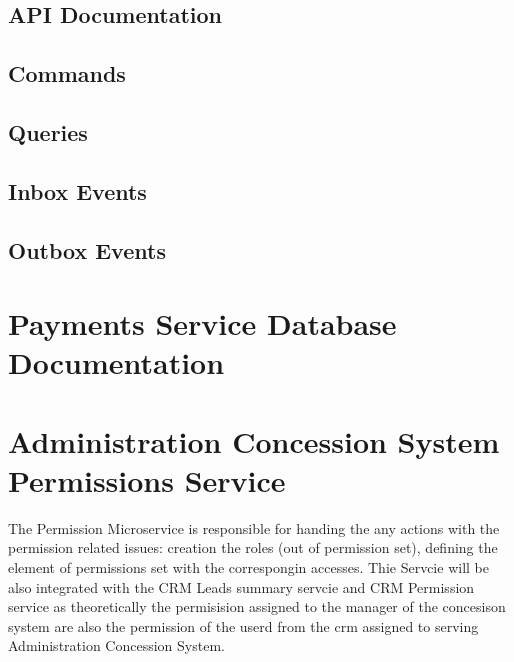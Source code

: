 \documentclass[letterpaper,10pt,english]{sphinxmanual}
\begin{document}


\subsection{API Documentation}
\label{\detokenize{administration_concession_system/payments_service:api-documentation}}

\subsection{Commands}
\label{\detokenize{administration_concession_system/payments_service:commands}}

\subsection{Queries}
\label{\detokenize{administration_concession_system/payments_service:queries}}

\subsection{Inbox Events}
\label{\detokenize{administration_concession_system/payments_service:inbox-events}}

\subsection{Outbox Events}
\label{\detokenize{administration_concession_system/payments_service:outbox-events}}

\section{Payments Service Database Documentation}
\label{\detokenize{administration_concession_system/payments_service:payments-service-database-documentation}}
\sphinxstepscope


\section{Administration Concession System Permissions Service}
\label{\detokenize{administration_concession_system/permissions_service:administration-concession-system-permissions-service}}\label{\detokenize{administration_concession_system/permissions_service::doc}}
\sphinxAtStartPar
The Permission Microservice is responsible for handing the any actions with the permission related issues: creation the roles (out of permission set), defining the element of permissions set with the correspongin accesses. Thie Servcie will be also integrated with the CRM Leads summary servcie and CRM Permission service as theoretically the permisision assigned to the manager of the concesison system are also the permission of the userd from the crm assigned to serving Administration Concession System.
\end{document}
